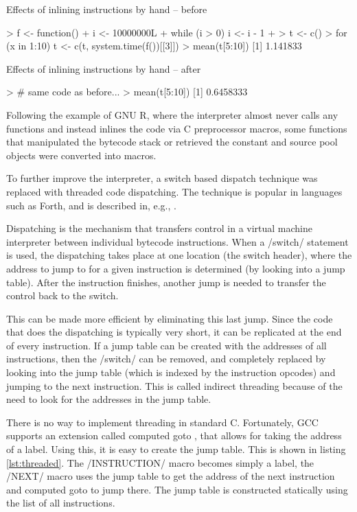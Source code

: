 \begin{listing}[htbp]
  \caption{\label{lst:before-inline}Effects of inlining instructions by hand -- before}
  \begin{rcode}
> f <- function() {
+     i <- 10000000L
+     while (i > 0) i <- i - 1
+ }
> t <- c()
> for (x in 1:10) t <- c(t, system.time(f())[[3]])
> mean(t[5:10])
[1] 1.141833
  \end{rcode}
\end{listing}

\begin{listing}[htbp]
  \caption{\label{lst:after-inline}Effects of inlining instructions by hand -- after}
  \begin{rcode}
> # same code as before...
> mean(t[5:10])
[1] 0.6458333
  \end{rcode}
\end{listing}

Following the example of GNU R, where the interpreter almost never calls any functions and instead inlines the code via C preprocessor macros, some functions that manipulated the bytecode stack or retrieved the constant and source pool objects were converted into macros.

To further improve the interpreter, a switch based dispatch technique was replaced with threaded code dispatching. The technique is popular in languages such as Forth, and is described in, e.g., \autocite{threading}.

Dispatching is the mechanism that transfers control in a virtual machine interpreter between individual bytecode instructions. When a \cinline/switch/ statement is used, the dispatching takes place at one location (the switch header), where the address to jump to for a given instruction is determined (by looking into a jump table). After the instruction finishes, another jump is needed to transfer the control back to the switch.

This can be made more efficient by eliminating this last jump. Since the code that does the dispatching is typically very short, it can be replicated at the end of every instruction. If a jump table can be created with the addresses of all instructions, then the \cinline/switch/ can be removed, and completely replaced by looking into the jump table (which is indexed by the instruction opcodes) and jumping to the next instruction. This is called indirect threading because of the need to look for the addresses in the jump table.

There is no way to implement threading in standard C. Fortunately, GCC supports an extension called computed goto \autocite{gcc-computed-goto}, that allows for taking the address of a label. Using this, it is easy to create the jump table. This is shown in listing \ref{lst:threaded}. The \cinline/INSTRUCTION/ macro becomes simply a label, the \cinline/NEXT/ macro uses the jump table to get the address of the next instruction and computed goto to jump there. The jump table is constructed statically using the list of all instructions.

